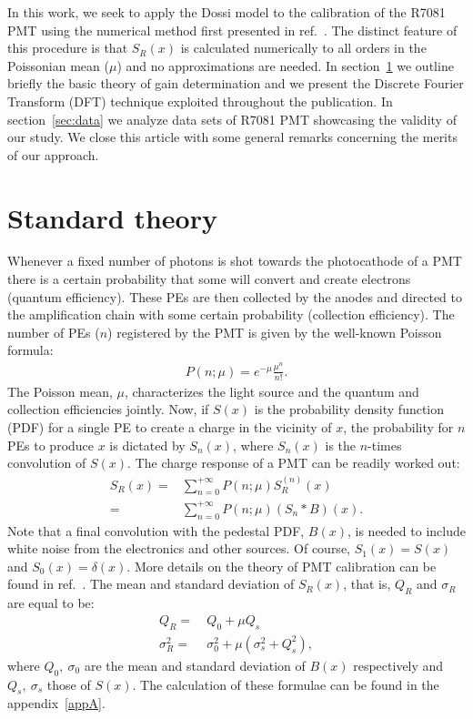 \documentclass[a4paper,11pt]{article}
\begin{document}
In this work, we seek to apply the Dossi model to the calibration of the R7081 PMT using the numerical method first presented in ref.~\cite{me}. 
The distinct feature of this procedure is that $S_R(x)$ is calculated numerically to all orders in the Poissonian mean ($\mu$) and no approximations are needed. 
In section~\ref{sec:theo} we outline briefly the basic theory of gain determination and we present the Discrete Fourier Transform (DFT) technique exploited throughout the publication. 
In section~\ref{sec:data} we analyze data sets of R7081 PMT showcasing the validity of our study. 
We close this article with some general remarks concerning the merits of our approach.


\section{Standard theory}
\label{sec:theo}


Whenever a fixed number of photons is shot towards the photocathode of a PMT there is a certain probability that some will convert and create electrons (quantum efficiency). 
These PEs are then collected by the anodes and directed to the amplification chain with some certain probability (collection efficiency). 
The number of PEs ($n$) registered by the PMT is given by the well-known Poisson formula:
\begin{align}
P(n;\mu) = e^{-\mu}\frac{\mu^n}{n!}. \label{eq:poisson}
\end{align}
The Poisson mean, $\mu$, characterizes the light source and the quantum and collection efficiencies jointly. 
Now, if $S(x)$ is the probability density function (PDF) for a single PE to create a charge in the vicinity of $x$, 
the probability for $n$ PEs to produce $x$ is dictated by $S_n(x)$, where $S_n(x)$ is the $n$-times convolution of $S(x)$. 
The charge response of a PMT can be readily worked out:
\begin{align}
S_R(x) = &\sum_{n=0}^{+\infty} P(n;\mu)   S^{(n)}_R(x) \nonumber \\
            = & \sum_{n=0}^{+\infty} P(n;\mu) (S_n*B)(x). \label{eq:sr}
\end{align}
Note that a final convolution with the pedestal PDF, $B(x)$, is needed to include white noise from the electronics and other sources. 
Of course, $S_1(x)=S(x)$ and $S_0(x)=\delta(x)$. More details on the theory of PMT calibration can be found in ref.~\cite{me}.
The mean and standard deviation of $S_R(x)$, that is, $Q_R$ and $\sigma_R$ are equal to be:
\begin{align}
Q_R  = & \ Q_0 + \mu Q_s \\
\sigma_R^2      = & \  \sigma_0^2 + \mu( \sigma_s^2 + Q_s^2 ),  
\end{align}
where $Q_0, \ \sigma_0$ are the mean and standard deviation of $B(x)$ respectively and $Q_s, \ \sigma_s$ those of $S(x)$.
The calculation of these formulae can be found in the appendix~\ref{appA}. 
\end{document}
